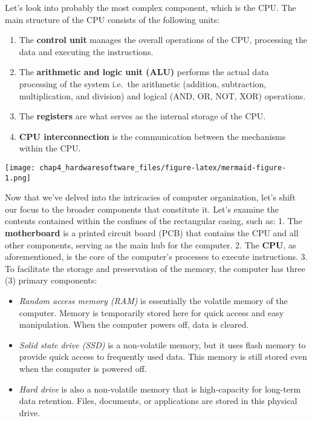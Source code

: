\documentclass[
  letterpaper,
  DIV=11,
  numbers=noendperiod]{scrreprt}
\providecommand{\tightlist}{%
  \setlength{\itemsep}{0pt}\setlength{\parskip}{0pt}}\usepackage{longtable,booktabs,array}
\begin{document}
Let's look into probably the most complex component, which is the CPU.
The main structure of the CPU consists of the following units:

\begin{enumerate}
\def\labelenumi{\arabic{enumi}.}
\tightlist
\item
  The \textbf{control unit} manages the overall operations of the CPU,
  processing the data and executing the instructions.
\item
  The \textbf{arithmetic and logic unit (ALU)} performs the actual data
  processing of the system i.e.~the arithmetic (addition, subtraction,
  multiplication, and division) and logical (AND, OR, NOT, XOR)
  operations.
\item
  The \textbf{registers} are what serves as the internal storage of the
  CPU.
\item
  \textbf{CPU interconnection} is the communication between the
  mechanisms within the CPU.
\end{enumerate}

\texttt{[image: chap4\_hardwaresoftware\_files/figure-latex/mermaid-figure-1.png]}

Now that we've delved into the intricacies of computer organization,
let's shift our focus to the broader components that constitute it.
Let's examine the contents contained within the confines of the
rectangular casing, such as: 1. The \textbf{motherboard} is a printed
circuit board (PCB) that contains the CPU and all other components,
serving as the main hub for the computer. 2. The \textbf{CPU}, as
aforementioned, is the core of the computer's processes to execute
instructions. 3. To facilitate the storage and preservation of the
memory, the computer has three (3) primary components:

\begin{itemize}
\tightlist
\item
  \emph{Random access memory (RAM)} is essentially the volatile memory
  of the computer. Memory is temporarily stored here for quick access
  and easy manipulation. When the computer powers off, data is cleared.
\item
  \emph{Solid state drive (SSD)} is a non-volatile memory, but it uses
  flash memory to provide quick access to frequently used data. This
  memory is still stored even when the computer is powered off.
\item
  \emph{Hard drive} is also a non-volatile memory that is high-capacity
  for long-term data retention. Files, documents, or applications are
  stored in this physical drive.
\end{itemize}
\end{document}
